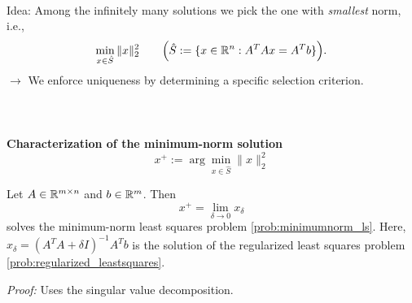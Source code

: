 \begin{frame}
~\\
Idea: Among the infinitely many solutions we pick the one with \textit{smallest} norm, i.e.,
\begin{equation}\label{prob:minimumnorm_ls}
 \min_{x \in \hat{S}}  \|x\|_2^2~ ~~~~~{\small\left(\hat{S} := \{x \in {\mathbb{R}}^{n}: A^TAx = A^Tb \}\right)}.
\end{equation}  
$\rightarrow$ We enforce uniqueness by determining a specific selection criterion.
~\\~\\~\\~\\
\textbf{Characterization of the minimum-norm solution} 
$$x^+ := \arg \min_{x \in \hat{S}}\|x\|_2^2$$
\begin{theo}
	Let $A \in {\mathbb{R}}^{m\times n}$ and $b \in {\mathbb{R}}^{m}$. Then $$x^+ = \lim\limits_{\delta \to 0} x_\delta$$ 
	solves the minimum-norm least squares problem \eqref{prob:minimumnorm_ls}. Here, $x_\delta = (A^TA  + \delta I)^{-1}A^Tb$ is the solution of the regularized least squares problem \eqref{prob:regularized_leastsquares}.
\end{theo}
\textit{Proof:} Uses the singular value decomposition.\\
~~\\

\end{frame}

